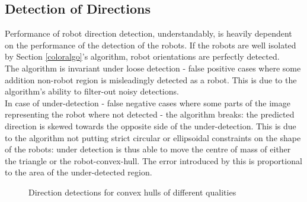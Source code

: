 \documentclass[10pt,a4paper]{article}
\begin{document}
\subsection{Detection of Directions}\label{directionresults}
Performance of robot direction detection, understandably, is heavily dependent 
on the performance of the detection of the robots. If the robots are well
isolated by Section \ref{coloralgo}'s algorithm, robot orientations are 
perfectly detected.\\
The algorithm is invariant under loose detection - false positive cases where 
some addition non-robot region is misleadingly detected as a robot. This is 
due to the algorithm's ability to filter-out noisy detections.\\
In case of under-detection - false negative cases where some parts of the image
representing the robot where not detected - the algorithm breaks: the predicted
direction is skewed towards the opposite side of the under-detection. This is
due to the algorithm not putting strict circular or ellipsoidal constraints on 
the shape of the robots: under detection is thus able to move the centre of 
mass of either the triangle or the robot-convex-hull. The error introduced by 
this is proportional to the area of the under-detected region.
\begin{figure}[ht]
    \begin{center}
    \end{center}
    \caption{Direction detections for convex hulls of different qualities}
\end{figure} 
\end{document}
